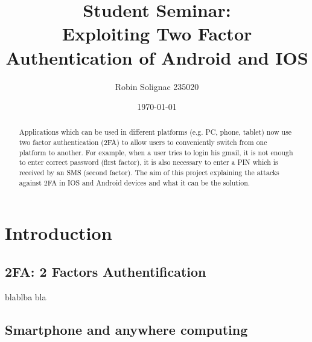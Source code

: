 \documentclass[11pt]{article}
\title{Student Seminar: \\Exploiting Two Factor Authentication of Android and IOS}
\author{Robin Solignac 235020}
\date{\today}
\begin{document}
\maketitle
\begin{abstract}
   Applications  which  can  be  used  in  different  platforms  (e.g.   PC,  phone,  tablet)  now  use  two
factor authentication (2FA) to allow users to conveniently switch from one platform to another.
For example, when a user tries to login his gmail, it is not enough to enter correct password (first
factor), it is also necessary to enter a PIN which is received by an SMS (second factor).  The aim
of this project explaining the attacks against 2FA in IOS and Android devices and what it can
be the solution. 
\end{abstract}
\section{Introduction}
\subsection{2FA: 2 Factors Authentification}
blablba bla
\subsection{Smartphone and anywhere computing}
\end{document}
